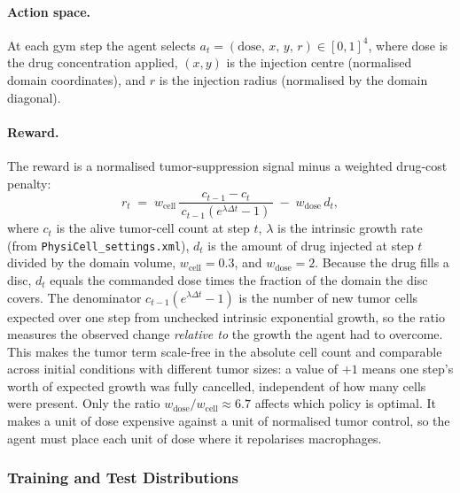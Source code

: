 \documentclass{article}
\begin{document}
\paragraph{Action space.}
At each gym step the agent selects
$a_t = (\text{dose},\,x,\,y,\,r)\in[0,1]^4$,
where dose is the drug concentration applied, $(x,y)$ is the injection centre
(normalised domain coordinates), and $r$ is the injection radius (normalised
by the domain diagonal).

\paragraph{Reward.}
The reward is a normalised tumor-suppression signal minus a weighted drug-cost penalty:
\begin{equation}
  r_t \;=\; w_{\text{cell}}\,
  \frac{c_{t-1} - c_t}{\,c_{t-1}(e^{\lambda\Delta t}-1)\,}
  \;-\; w_{\text{dose}}\, d_t,
  \label{eq:reward}
\end{equation}
where $c_t$ is the alive tumor-cell count at step $t$,
$\lambda$ is the intrinsic growth rate (from \texttt{PhysiCell\_settings.xml}),
$d_t$ is the amount of drug injected at step $t$ divided by the domain volume,
$w_{\text{cell}}=0.3$, and $w_{\text{dose}}=2$. Because the drug fills a disc,
$d_t$ equals the commanded dose times the fraction of the domain the disc
covers.
The denominator $c_{t-1}(e^{\lambda\Delta t}-1)$ is the number of new tumor cells
expected over one step from unchecked intrinsic exponential growth, so the ratio
measures the observed change \emph{relative to} the growth the agent had to
overcome. This makes the tumor term scale-free in the absolute cell count and
comparable across initial conditions with different tumor sizes: a value of $+1$
means one step's worth of expected growth was fully cancelled, independent of how
many cells were present.
Only the ratio $w_{\text{dose}}/w_{\text{cell}}\approx6.7$ affects which policy
is optimal. It makes a unit of dose expensive against a unit of normalised tumor
control, so the agent must place each unit of dose where it repolarises
macrophages.

\subsubsection*{Training and Test Distributions}
\label{sec:distributions}
\end{document}
